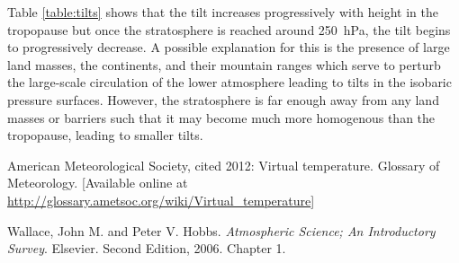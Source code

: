 \documentclass[11pt]{article}
\begin{document}
Table \ref{table:tilts} shows that the tilt increases progressively with height in the tropopause but once the stratosphere is reached around \SI{250}{\hecto\Pa}, the tilt begins to progressively decrease. A possible explanation for this is the presence of large land masses, the continents, and their mountain ranges which serve to perturb the large-scale circulation of the lower atmosphere leading to tilts in the isobaric pressure surfaces. However, the stratosphere is far enough away from any land masses or barriers such that it may become much more homogenous than the tropopause, leading to smaller tilts.

\begin{thebibliography}{9}
American Meteorological Society, cited 2012: Virtual temperature. Glossary of Meteorology. [Available online at \url{http://glossary.ametsoc.org/wiki/Virtual_temperature}]

Wallace, John M. and Peter V. Hobbs. \textit{Atmospheric Science; An Introductory Survey}. Elsevier. Second Edition, 2006. Chapter 1.
\end{thebibliography}
\end{document}

